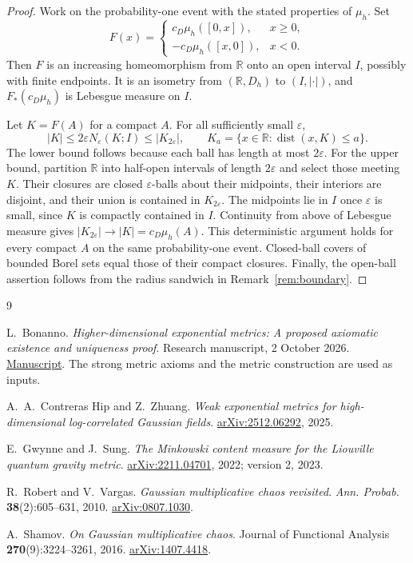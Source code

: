 \documentclass[11pt,letterpaper]{article}
\newcommand{\R}{\mathbb R}
\newcommand{\eps}{\varepsilon}
\DeclareMathOperator{\dist}{dist}
\theoremstyle{definition}
\theoremstyle{remark}
\numberwithin{equation}{section}
\begin{document}
\begin{proof}
Work on the probability-one event with the stated properties of $\mu_h$. Set
\begin{equation*}
 F(x)=\begin{cases}
 c_D\mu_h([0,x]),&x\ge0,\\
 -c_D\mu_h([x,0]),&x<0.
 \end{cases}
\end{equation*}
Then $F$ is an increasing homeomorphism from $\R$ onto an open interval $I$, possibly with finite endpoints. It is an isometry from $(\R,D_h)$ to $(I,|\cdot|)$, and $F_*(c_D\mu_h)$ is Lebesgue measure on $I$.

Let $K=F(A)$ for a compact $A$. For all sufficiently small $\eps$,
\begin{equation*}
 |K|\le 2\eps N_\eps(K;I)\le |K_{2\eps}|,
 \qquad K_a=\{x\in\R:\dist(x,K)\le a\}.
\end{equation*}
The lower bound follows because each ball has length at most $2\eps$. For the upper bound, partition $\R$ into half-open intervals of length $2\eps$ and select those meeting $K$. Their closures are closed $\eps$-balls about their midpoints, their interiors are disjoint, and their union is contained in $K_{2\eps}$. The midpoints lie in $I$ once $\eps$ is small, since $K$ is compactly contained in $I$. Continuity from above of Lebesgue measure gives $|K_{2\eps}|\to|K|=c_D\mu_h(A)$. This deterministic argument holds for every compact $A$ on the same probability-one event. Closed-ball covers of bounded Borel sets equal those of their compact closures. Finally, the open-ball assertion follows from the radius sandwich in Remark~\ref{rem:boundary}.
\end{proof}

\begin{thebibliography}{9}

L.~Bonanno.
\emph{Higher-dimensional exponential metrics:
A proposed axiomatic existence and uniqueness proof}. Research manuscript, 2 October 2026.
\href{https://github.com/leobon12/ai-generated-mathematics/blob/main/papers/higher-dimensional-lqg-metric.pdf}{Manuscript}.
The strong metric axioms and the metric construction are used as inputs.

A.~A.~Contreras Hip and Z.~Zhuang.
\emph{Weak exponential metrics for high-dimensional log-correlated
Gaussian fields}.
\href{https://arxiv.org/abs/2512.06292}{arXiv:2512.06292}, 2025.

E.~Gwynne and J.~Sung.
\emph{The Minkowski content measure for the Liouville quantum gravity metric}.
\href{https://arxiv.org/abs/2211.04701}{arXiv:2211.04701}, 2022;
version 2, 2023.

R.~Robert and V.~Vargas.
\emph{Gaussian multiplicative chaos revisited}.
\emph{Ann. Probab.} \textbf{38}(2):605--631, 2010.
\href{https://arxiv.org/abs/0807.1030}{arXiv:0807.1030}.

A.~Shamov.
\emph{On Gaussian multiplicative chaos}.
Journal of Functional Analysis \textbf{270}(9):3224--3261, 2016.
\href{https://arxiv.org/abs/1407.4418}{arXiv:1407.4418}.

\end{thebibliography}
\end{document}
